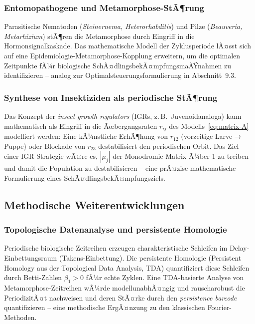 ﻿\documentclass[12pt, a4paper]{article}
\theoremstyle{definition}
\begin{document}
\subsubsection{Entomopathogene und Metamorphose-StÃ¶rung}
Parasitische Nematoden (\emph{Steinernema, Heterorhabditis}) und Pilze
(\emph{Beauveria, Metarhizium}) stÃ¶ren die Metamorphose durch Eingriff in die
Hormonsignalkaskade. Das mathematische Modell der Zyklusperiode lÃ¤sst sich auf
eine Epidemiologie-Metamorphose-Kopplung erweitern, um die optimalen Zeitpunkte
fÃ¼r biologische SchÃ¤dlingsbekÃ¤mpfungsmaÃŸnahmen zu identifizieren -- analog zur
Optimalsteuerungsformulierung in Abschnitt~9.3.

\subsubsection{Synthese von Insektiziden als periodische StÃ¶rung}
Das Konzept der \emph{insect growth regulators} (IGRs, z.\,B.\ Juvenoidanaloga)
kann mathematisch als Eingriff in die Ãœbergangsraten $r_{ij}$ des Modells~\eqref{eq:matrix-A}
modelliert werden: Eine kÃ¼nstliche ErhÃ¶hung von $r_{12}$ (vorzeitige Larve$\to$Puppe)
oder Blockade von $r_{23}$ destabilisiert den periodischen Orbit. Das Ziel einer
IGR-Strategie wÃ¤re es, $|\mu_j|$ der Monodromie-Matrix Ã¼ber 1 zu treiben und
damit die Population zu destabilisieren -- eine prÃ¤zise mathematische Formulierung
eines SchÃ¤dlingsbekÃ¤mpfungsziels.

\subsection{Methodische Weiterentwicklungen}

\subsubsection{Topologische Datenanalyse und persistente Homologie}
Periodische biologische Zeitreihen erzeugen charakteristische Schleifen im
Delay-Einbet\-tungsraum (Takens-Einbettung). Die persistente Homologie (Persistent
Homology aus der Topological Data Analysis, TDA) quantifiziert diese Schleifen
durch Betti-Zahlen $\beta_1 > 0$ fÃ¼r echte Zyklen. Eine TDA-basierte Analyse
von Metamorphose-Zeitreihen wÃ¼rde modellunabhÃ¤ngig und rauscharobust die
PeriodizitÃ¤t nachweisen und deren StÃ¤rke durch den \emph{persistence barcode}
quantifizieren -- eine methodische ErgÃ¤nzung zu den klassischen Fourier-Methoden.
\end{document}
